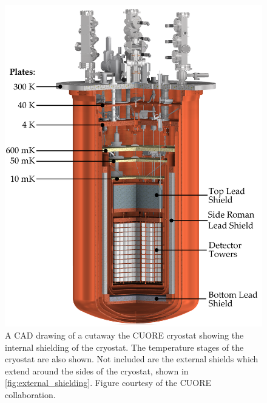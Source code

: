 \begin{figure}[htbp]
\centering
\includegraphics[width=\linewidth]{Figures/cryostat_Adjusted.png}
\caption[CAD cutaway of the CUORE cryostat.]
{A CAD drawing of a cutaway the CUORE cryostat showing the internal shielding of the cryostat.
The temperature stages of the cryostat are also shown.
Not included are the external shields which extend around the sides of the cryostat, shown in \autoref{fig:external_shielding}.
Figure courtesy of the CUORE collaboration.}
\label{fig:cryostat_cad_cutout}
\end{figure}

